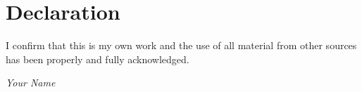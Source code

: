 \chapter{Declaration}

I confirm that this is my own work and the use of all material from other sources has been properly and fully acknowledged.

\vspace{2em}

\hfill \textit{Your Name} \hspace{1em}